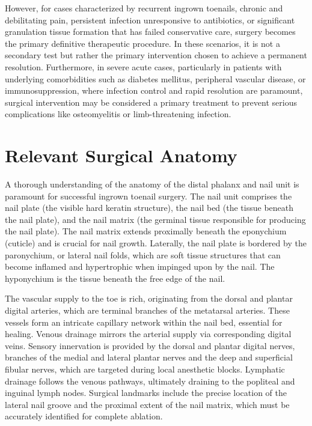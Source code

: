However, for cases characterized by recurrent ingrown toenails, chronic and debilitating pain, persistent infection unresponsive to antibiotics, or significant granulation tissue formation that has failed conservative care, surgery becomes the primary definitive therapeutic procedure. In these scenarios, it is not a secondary test but rather the primary intervention chosen to achieve a permanent resolution. Furthermore, in severe acute cases, particularly in patients with underlying comorbidities such as diabetes mellitus, peripheral vascular disease, or immunosuppression, where infection control and rapid resolution are paramount, surgical intervention may be considered a primary treatment to prevent serious complications like osteomyelitis or limb-threatening infection.

\section*{Relevant Surgical Anatomy}
A thorough understanding of the anatomy of the distal phalanx and nail unit is paramount for successful ingrown toenail surgery. The nail unit comprises the nail plate (the visible hard keratin structure), the nail bed (the tissue beneath the nail plate), and the nail matrix (the germinal tissue responsible for producing the nail plate). The nail matrix extends proximally beneath the eponychium (cuticle) and is crucial for nail growth. Laterally, the nail plate is bordered by the paronychium, or lateral nail folds, which are soft tissue structures that can become inflamed and hypertrophic when impinged upon by the nail. The hyponychium is the tissue beneath the free edge of the nail.

The vascular supply to the toe is rich, originating from the dorsal and plantar digital arteries, which are terminal branches of the metatarsal arteries. These vessels form an intricate capillary network within the nail bed, essential for healing. Venous drainage mirrors the arterial supply via corresponding digital veins. Sensory innervation is provided by the dorsal and plantar digital nerves, branches of the medial and lateral plantar nerves and the deep and superficial fibular nerves, which are targeted during local anesthetic blocks. Lymphatic drainage follows the venous pathways, ultimately draining to the popliteal and inguinal lymph nodes. Surgical landmarks include the precise location of the lateral nail groove and the proximal extent of the nail matrix, which must be accurately identified for complete ablation.

